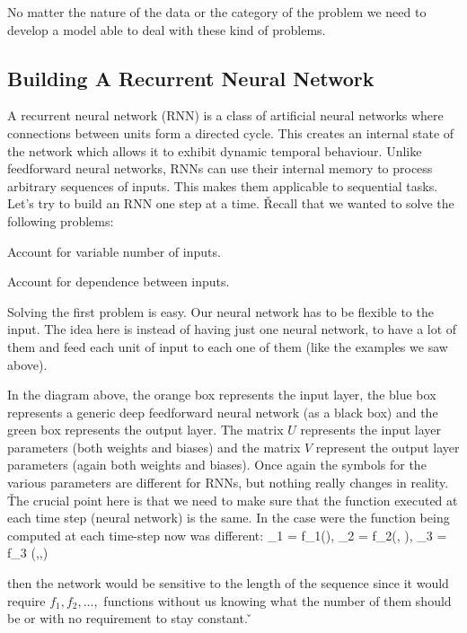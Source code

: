 
No matter the nature of the data or the category of the problem we need to develop a model able to deal with these
kind of problems.

\subsection{Building A Recurrent Neural Network}

A recurrent neural network (RNN) is a class of artificial neural networks where connections between units form a
directed cycle. This creates an internal state of the network which allows it to exhibit dynamic temporal behaviour.
Unlike feedforward neural networks, RNNs can use their internal memory to process arbitrary sequences of inputs. This
makes them applicable to sequential tasks. Let's try to build an RNN one step at a time. \v

Recall that we wanted to solve the following problems:
\bit
\item Account for variable number of inputs.
\item Account for dependence between inputs.
\eit

Solving the first problem is easy. Our neural network has to be flexible to the input. The idea here is instead of
having just one neural network, to have a lot of them and feed each unit of input to each one of them (like the
examples we saw above).


In the diagram above, the orange box represents the input layer, the blue box represents a generic deep feedforward
neural network (as a black box) and the green box represents the output layer. The matrix $U$ represents the input
layer parameters (both weights and biases) and the matrix $V$ represent the output layer parameters (again both
weights and biases). Once again the symbols for the various parameters are different for RNNs, but nothing really
changes in reality. \v

The crucial point here is that we need to make sure that the function executed at each time step (neural network) is
the same. In the case were the function being computed at each time-step now was different:
\bse
{}_1 = f_1(), \qquad {}_2 = f_2(, ), \qquad {}_3
= f_3 (,,)
\ese

then the network would be sensitive to the length of the sequence since it would require $f_1, f_2, \ldots,$
functions without us knowing what the number of them should be or with no requirement to stay constant. \v

